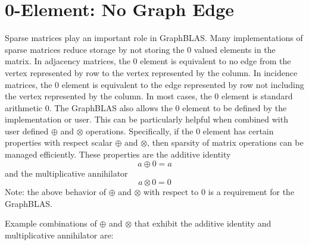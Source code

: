 \section{0-Element: No Graph Edge}
  Sparse matrices play an important role in GraphBLAS.  Many implementations of sparse matrices reduce storage by not storing the 0 valued elements in the matrix.  In adjacency matrices, the 0 element is equivalent to no edge from the vertex represented by row to the vertex represented by the column. In incidence matrices, the 0 element is equivalent to the edge represented by row not including the vertex represented by the column.  In most cases, the 0 element is standard arithmetic 0.  The GraphBLAS also allows the 0 element to be defined by the implementation or user.  This can be particularly helpful when combined with user defined $\oplus$ and $\otimes$ operations.  Specifically, if the 0 element has certain properties with respect scalar $\oplus$ and $\otimes$, then sparsity of matrix operations can be managed efficiently.  These properties are the additive identity
$$
     a \oplus 0 = a
$$
and the multiplicative annihilator
$$
     a \otimes 0 = 0
$$
Note: the above behavior of $\oplus$ and $\otimes$ with respect to 0 is a requirement for the GraphBLAS.

  Example combinations of $\oplus$ and $\otimes$ that exhibit the additive identity and multiplicative annihilator are:

%
%
%
%

